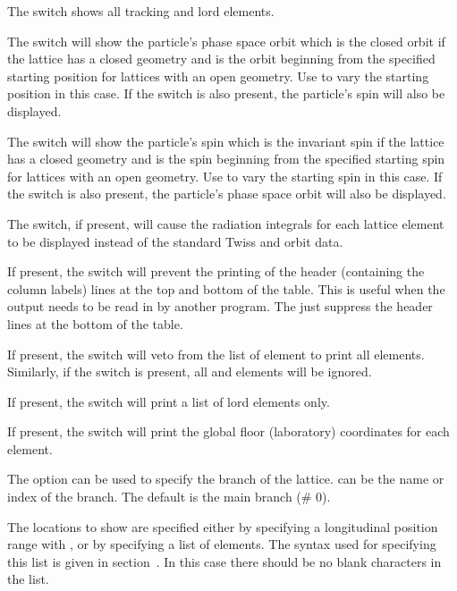 {{{{{The  switch shows all tracking and lord elements.

The  switch will show the particle's phase space orbit which is the closed orbit if the
lattice has a closed geometry and is the orbit beginning from the specified starting position for
lattices with an open geometry. Use  to vary the starting position in this
case. If the  switch is also present, the particle's spin will also be displayed.

The  switch will show the particle's spin which is the invariant spin if the lattice has a
closed geometry and is the spin beginning from the specified starting spin for lattices with an open
geometry. Use  to vary the starting spin in this case. If the  switch
is also present, the particle's phase space orbit will also be displayed.

The  switch, if present, will cause the radiation integrals for
each lattice element to be displayed instead of the standard Twiss and orbit data.

If present, the  switch will prevent the printing of the header
(containing the column labels) lines at the top and bottom of the table.  This is useful
when the output needs to be read in by another program. The  just
suppress the header lines at the bottom of the table.

If present, the  switch will veto from the list of element to print all
 elements. Similarly, if the  switch is present, all 
and  elements will be ignored.

If present, the  switch will print a list of lord elements only.

If present, the  switch will print the global floor (laboratory)
coordinates for each element.

The  option can be used to specify the branch of the
lattice.  can be the name or index of the branch.  The default is the
main branch (\# 0).

The locations to show are specified either by specifying a longitudinal position range
with , or by specifying a list  of elements.  The syntax used
for specifying this list is given in section~.  In this case there
should be no blank characters in the list.

}}}}}
